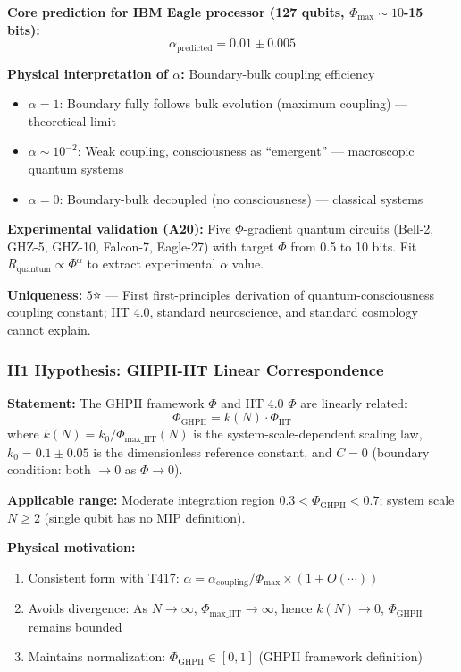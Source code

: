 \documentclass[12pt,a4paper]{article}
\begin{document}
\textbf{Core prediction for IBM Eagle processor (127 qubits, $\Phi_{\text{max}} \sim 10$-15 bits):}
\begin{equation}
\alpha_{\text{predicted}} = 0.01 \pm 0.005
\end{equation}

\textbf{Physical interpretation of $\alpha$:} Boundary-bulk coupling efficiency
\begin{itemize}
\item $\alpha = 1$: Boundary fully follows bulk evolution (maximum coupling) --- theoretical limit
\item $\alpha \sim 10^{-2}$: Weak coupling, consciousness as ``emergent'' --- macroscopic quantum systems
\item $\alpha = 0$: Boundary-bulk decoupled (no consciousness) --- classical systems
\end{itemize}

\textbf{Experimental validation (A20):} Five $\Phi$-gradient quantum circuits (Bell-2, GHZ-5, GHZ-10, Falcon-7, Eagle-27) with target $\Phi$ from 0.5 to 10 bits. Fit $R_{\text{quantum}} \propto \Phi^\alpha$ to extract experimental $\alpha$ value.

\textbf{Uniqueness:} 5⭐ --- First first-principles derivation of quantum-consciousness coupling constant; IIT 4.0, standard neuroscience, and standard cosmology cannot explain.

\subsubsection{H1 Hypothesis: GHPII-IIT Linear Correspondence}

\textbf{Statement:} The GHPII framework $\Phi$ and IIT 4.0 $\Phi$ are linearly related:
\begin{equation}
\Phi_{\text{GHPII}} = k(N) \cdot \Phi_{\text{IIT}}
\end{equation}
where $k(N) = k_0 / \Phi_{\text{max\_IIT}}(N)$ is the system-scale-dependent scaling law, $k_0 = 0.1 \pm 0.05$ is the dimensionless reference constant, and $C = 0$ (boundary condition: both $\to 0$ as $\Phi \to 0$).

\textbf{Applicable range:} Moderate integration region $0.3 < \Phi_{\text{GHPII}} < 0.7$; system scale $N \geq 2$ (single qubit has no MIP definition).

\textbf{Physical motivation:}
\begin{enumerate}
\item Consistent form with T417: $\alpha = \alpha_{\text{coupling}} / \Phi_{\text{max}} \times (1 + O(\cdots))$
\item Avoids divergence: As $N \to \infty$, $\Phi_{\text{max\_IIT}} \to \infty$, hence $k(N) \to 0$, $\Phi_{\text{GHPII}}$ remains bounded
\item Maintains normalization: $\Phi_{\text{GHPII}} \in [0, 1]$ (GHPII framework definition)
\end{enumerate}
\end{document}
